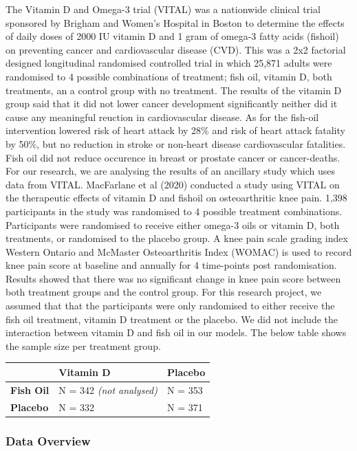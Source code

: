 \documentclass{article}
\begin{document}
The Vitamin D and Omega-3 trial (VITAL) was a nationwide clinical trial
sponsored by Brigham and Women's Hospital in Boston to determine the
effects of daily doses of 2000 IU vitamin D and 1 gram of omega-3 fatty
acids (fishoil) on preventing cancer and cardiovascular disease (CVD).
This was a 2x2 factorial designed longitudinal randomised controlled
trial in which 25,871 adults were randomised to 4 possible combinations
of treatment; fish oil, vitamin D, both treatments, an a control group
with no treatment. The results of the vitamin D group said that it did
not lower cancer development significantly neither did it cause any
meaningful reuction in cardiovascular disease. As for the fish-oil
intervention lowered risk of heart attack by 28\% and risk of heart
attack fatality by 50\%, but no reduction in stroke or non-heart disease
cardiovascular fatalities. Fish oil did not reduce occurence in breast
or prostate cancer or cancer-deaths. For our research, we are analysing
the results of an ancillary study which uses data from VITAL. MacFarlane
et al (2020) conducted a study using VITAL on the therapeutic effects of
vitamin D and fishoil on osteoarthritic knee pain. 1,398 participants in
the study was randomised to 4 possible treatment combinations.
Participants were randomised to receive either omega-3 oils or vitamin
D, both treatments, or randomised to the placebo group. A knee pain
scale grading index Western Ontario and McMaster Osteoarthritis Index
(WOMAC) is used to record knee pain score at baseline and annually for 4
time-points post randomisation. Results showed that there was no
significant change in knee pain score between both treatment groups and
the control group. For this research project, we assumed that that the
participants were only randomised to either receive the fish oil
treatment, vitamin D treatment or the placebo. We did not include the
interaction between vitamin D and fish oil in our models. The below
table shows the sample size per treatment group.

\begin{longtable}[]{@{}lll@{}}
\toprule\noalign{}
& \textbf{Vitamin D} & \textbf{Placebo} \\
\midrule\noalign{}
\endhead
\bottomrule\noalign{}
\endlastfoot
\textbf{Fish Oil} & N = 342 \emph{(not analysed)} & N = 353 \\
\textbf{Placebo} & N = 332 & N = 371 \\
\end{longtable}

\subsubsection{Data Overview}\label{data-overview-1}
\end{document}
